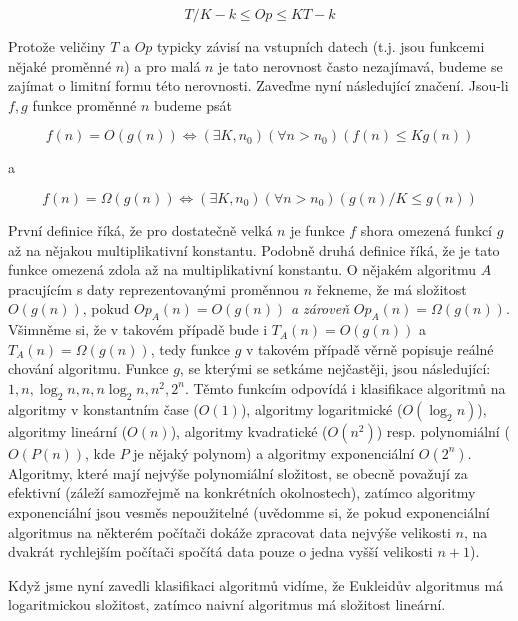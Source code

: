 \begin{displaymath}
 T/K - k \leq Op \leq KT - k
\end{displaymath}

Protože veličiny $T$ a $Op$ typicky závisí na vstupních datech (t.j. jsou funkcemi nějaké proměnné $n$) a pro malá $n$ je tato nerovnost často
nezajímavá, budeme se zajímat o limitní formu této nerovnosti. Zaveďme nyní následující značení. Jsou-li $f,g$ funkce proměnné $n$ budeme psát

\begin{displaymath}
 f(n) = O(g(n)) \iff (\exists K,n_0)(\forall n>n_0)(f(n)\leq Kg(n))
\end{displaymath}

a

\begin{displaymath}
 f(n) = \Omega(g(n)) \iff (\exists K,n_0)(\forall n>n_0)(g(n)/K\leq g(n))
\end{displaymath}

První definice říká, že pro dostatečně velká $n$ je funkce $f$ shora omezená funkcí $g$ až na nějakou multiplikativní konstantu. Podobně
druhá definice říká, že je tato funkce omezená zdola až na multiplikativní konstantu. O nějakém algoritmu $A$ pracujícím s daty reprezentovanými
proměnnou $n$ řekneme, že má složitost $O(g(n))$, pokud $Op_A(n) = O(g(n))$ \emph{a zároveň} $Op_A(n) = \Omega(g(n))$. Všimněme si, že v takovém
případě bude i $T_A(n) = O(g(n))$ a $T_A(n)=\Omega(g(n))$, tedy funkce $g$ v takovém případě věrně popisuje reálné chování algoritmu. Funkce $g$,
se kterými se setkáme nejčastěji, jsou následující: $1, n, \log_2 n, n, n\log_2 n, n^2, 2^n$. Těmto funkcím odpovídá i klasifikace algoritmů na
algoritmy v konstantním čase ($O(1)$), algoritmy logaritmické ($O(\log_2 n)$), algoritmy lineární ($O(n)$), algoritmy kvadratické ($O(n^2)$) resp.
polynomiální ($O(P(n))$, kde $P$ je nějaký polynom) a algoritmy exponenciální $O(2^n)$. Algoritmy, které mají nejvýše polynomiální složitost, se
obecně považují za efektivní (záleží samozřejmě na konkrétních okolnostech), zatímco algoritmy exponenciální jsou vesměs nepoužitelné (uvědomme si,
že pokud exponenciální algoritmus na některém počítači dokáže zpracovat data nejvýše velikosti $n$, na dvakrát rychlejším počítači spočítá data
pouze o jedna vyšší velikosti $n+1$).

Když jsme nyní zavedli klasifikaci algoritmů vidíme, že Eukleidův algoritmus má logaritmickou složitost, zatímco naivní algoritmus má složitost
lineární.

\ifx\ucebnice\undefined

\fi